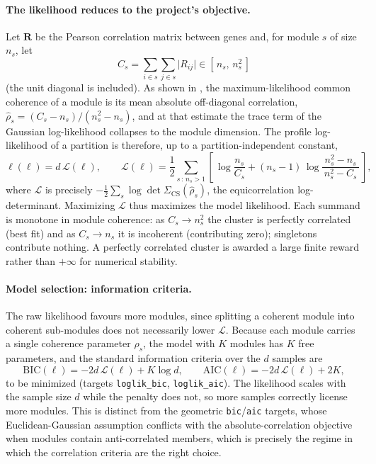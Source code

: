 \paragraph*{The likelihood reduces to the project's objective.}
Let $\mathbf{R}$ be the Pearson correlation matrix between genes and, for module
$s$ of size $n_s$, let
\begin{equation}
\label{eq:cs}
C_s = \sum_{i\in s}\sum_{j\in s} \lvert R_{ij}\rvert \in [\,n_s,\,n_s^{2}\,]
\end{equation}
(the unit diagonal is included). As shown in , the
maximum-likelihood common coherence of a module is its mean absolute
off-diagonal correlation, $\hat\rho_s=(C_s-n_s)/(n_s^2-n_s)$, and at that
estimate the trace term of the Gaussian log-likelihood collapses to the module
dimension. The profile log-likelihood of a partition is therefore, up to a
partition-independent constant,
\begin{equation}
\label{eq:loglik}
\ell(\boldsymbol{\ell}) = d\,\mathcal{L}(\boldsymbol{\ell}),
\qquad
\mathcal{L}(\boldsymbol{\ell}) = \frac{1}{2}\sum_{s\,:\,n_s>1}
\left[\, \log\!\frac{n_s}{C_s}
   + (n_s-1)\,\log\!\frac{n_s^{2}-n_s}{\,n_s^{2}-C_s\,} \,\right],
\end{equation}
where $\mathcal{L}$ is precisely $-\tfrac12\sum_s\log\det\Sigma_{\mathrm{CS}}(\hat\rho_s)$,
the equicorrelation log-determinant. Maximizing $\mathcal{L}$ thus maximizes the
model likelihood. Each summand is monotone in module coherence: as
$C_s\to n_s^2$ the cluster is perfectly correlated (best fit) and as $C_s\to n_s$
it is incoherent (contributing zero); singletons contribute nothing. A perfectly
correlated cluster is awarded a large finite reward rather than $+\infty$ for
numerical stability.

\paragraph*{Model selection: information criteria.}
The raw likelihood favours more modules, since splitting a coherent module into
coherent sub-modules does not necessarily lower $\mathcal{L}$. Because each module carries a single coherence parameter $\rho_s$, the model with $K$ modules has $K$ free
parameters, and the standard information criteria over the $d$ samples are
\begin{equation}
\label{eq:loglikic}
\mathrm{BIC}(\boldsymbol{\ell}) = -2 d\,\mathcal{L}(\boldsymbol{\ell}) + K\log d,
\qquad
\mathrm{AIC}(\boldsymbol{\ell}) = -2 d\,\mathcal{L}(\boldsymbol{\ell}) + 2K,
\end{equation}
to be minimized (targets \texttt{loglik\_bic}, \texttt{loglik\_aic}). The
likelihood scales with the sample size $d$ while the penalty does not, so more
samples correctly license more modules. This is distinct from the geometric
\texttt{bic}/\texttt{aic} targets, whose Euclidean-Gaussian assumption conflicts
with the absolute-correlation objective when modules contain anti-correlated
members, which is precisely the regime in which the correlation criteria are the right
choice.

